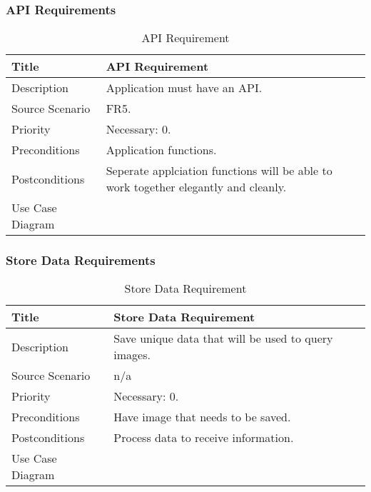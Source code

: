 \subsubsection{API Requirements}
  \begin{table}[h!]
    \caption{API Requirement}
    \label{system-requirements/functional-requirements/api-requirement}
    \begin{tabularx}{\textwidth}{|l|X|}
      \hline
      Title            & API Requirement \\ \hline
      Description      & Application must have an API. \\ \hline
      Source Scenario  & FR5. \\ \hline
      Priority         & Necessary: 0. \\ \hline
      Preconditions    & Application functions. \\ \hline
      Postconditions   & Seperate applciation functions will be able to work
                         together elegantly and cleanly. \\ \hline
      Use Case Diagram & \\ \hline
    \end{tabularx}
  \end{table}


\subsubsection{Store Data Requirements}
  \begin{table}[h!]
    \caption{Store Data Requirement}
    \label{system-requirements/functional-requirements/store-data-requirement}
    \begin{tabularx}{\textwidth}{|l|X|}
      \hline
      Title            & Store Data Requirement \\ \hline
      Description      & Save unique data that will be used to query images. \\ \hline
      Source Scenario  & n/a \\ \hline
      Priority         & Necessary: 0. \\ \hline
      Preconditions    & Have image that needs to be saved. \\ \hline
      Postconditions   & Process data to receive information. \\ \hline
      Use Case Diagram & \\ \hline
    \end{tabularx}
  \end{table}

